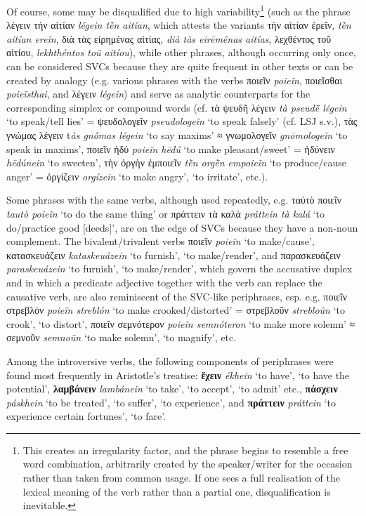 \documentclass[output=paper,colorlinks,citecolor=brown]{langscibook}
\begin{document}
Of course, some may be disqualified due to high variability\footnote{This creates an irregularity factor, and the phrase begins to resemble a free word combination, arbitrarily created by the speaker/writer for the occasion rather than taken from common usage. If one sees a full realisation of the lexical meaning of the verb rather than a partial one, disqualification is inevitable.} (such as the phrase λέγειν τὴν αἰτίαν \textit{légein tḕn aitían}, which attests the variants τὴν αἰτίαν ἐρεῖν, \textit{tḕn aitían ereĩn}, διὰ τὰς είρημένας αἰτίας, \textit{dià tàs eirēménas aitías}, λεχθέντος τοῦ αἰτίου, \textit{lekhthéntos toũ aitíou}), while other phrases, although occurring only once, can be considered SVCs because they are quite frequent in other texts or can be created by analogy (e.g. various phrases with the verbs ποιεῖν \textit{poieĩn}, ποιεῖσθαι \textit{poieĩsthai}, and λέγειν \textit{légein}) and serve as analytic counterparts for the corresponding simplex or compound words (cf. τὰ ψευδῆ λέγειν \textit{tà pseudē̃ légein} ‘to speak/tell lies' = ψευδολογεῖν \textit{pseudologeĩn} ‘to speak falsely' (cf. LSJ s.v.), τὰς γνώμας λέγειν t\textit{às gnṓmas légein} ‘to say maxims'  ≈ γνωμολογεῖν \textit{gnōmologeĩn} ‘to speak in maxims', ποιεῖν ἡδύ \textit{poieĩn hēdú} ‘to make pleasant/sweet' = ἡδύνειν \textit{hēdúnein} ‘to sweeten', τὴν ὀργὴν ἐμποιεῖν \textit{tḕn orgḕn empoieĩn} ‘to produce/cause anger' = ὀργίζειν \textit{orgízein} ‘to make angry', ‘to irritate', etc.). 


Some phrases with the same verbs, although used repeatedly, e.g. ταὐτὸ ποιεῖν \textit{tautò poieĩn} ‘to do the same thing' or πράττειν τὰ καλά \textit{práttein tà kalá} ‘to do/practice good [deeds]', are on the edge of SVCs because they have a non-noun complement. The bivalent/trivalent verbs ποιεῖν \textit{poieĩn} ‘to make/cause', κατασκευάζειν \textit{kataskeuázein} ‘to furnish', ‘to make/render', and παρασκευάζειν \textit{paraskeuázein} ‘to furnish', ‘to make/render', which govern the accusative duplex and in which a predicate adjective together with the verb can replace the causative verb, are also reminiscent of the SVC-like periphrases, esp. e.g. ποιεῖν στρεβλόν \textit{poieĩn streblón} ‘to make crooked/distorted' = στρεβλοῦν \textit{strebloũn} ‘to crook', ‘to distort', ποιεῖν σεμνότερον \textit{poieĩn semnóteron} ‘to make more solemn' ≈ σεμνοῦν \textit{semnoũn} ‘to make solemn', ‘to magnify', etc.

\clearpage
Among the introversive verbs, the following components of periphrases were found most frequently in Aristotle’s treatise: \textbf{ἔχειν} \textit{ékhein} ‘to have’, ‘to have the potential’, \textbf{λαμβάνειν} \textit{lambánein} ‘to take’, ‘to accept’, ‘to admit’ etc., \textbf{πάσχειν} \textit{páskhein} ‘to be treated’, ‘to suffer’, ‘to experience’, and \textbf{πράττειν} \textit{práttein} ‘to experience certain fortunes’, ‘to fare’. 
\end{document}
